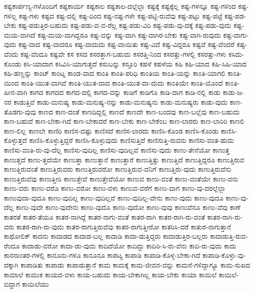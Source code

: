 {ಕಷ್ಟಕಾರ್ಪಣ್ಯ-ಗಳೊಂದಿಗೆ
ಕಷ್ಟಕಾರ್ಯ
ಕಷ್ಟಕಾಲ
ಕಷ್ಟಕಾಲ-ದಲ್ಲೆಲ್ಲಾ
ಕಷ್ಟಕ್ಕೆ
ಕಷ್ಟಕ್ಕೆಲ್ಲ
ಕಷ್ಟ-ಗಳನ್ನೂ
ಕಷ್ಟ-ಗಳಿಂದ
ಕಷ್ಟ-ಗಳಿಲ್ಲ
ಕಷ್ಟ-ಗಳು
ಕಷ್ಟದ
ಕಷ್ಟ-ದಲ್ಲಿ
ಕಷ್ಟ-ದಿಂದ
ಕಷ್ಟ-ನಷ್ಟ-ಗಳೇ
ಕಷ್ಟ-ಪಟ್ಟಿ-ರುವೆವು
ಕಷ್ಟ-ಪಟ್ಟು
ಕಷ್ಟ-ಪಟ್ಟೆ
ಕಷ್ಟ-ಪಡ-ಬೇಕು
ಕಷ್ಟ-ಪಡುತ್ತಿರ-ಬಹುದು
ಕಷ್ಟ-ಪಡು-ವ-ವ-ರೆಲ್ಲ
ಕಷ್ಟ-ಪಡು-ವಿರಿ
ಕಷ್ಟ-ಪಡು-ವು-ದಕ್ಕೆ
ಕಷ್ಟ-ಪಡು-ವುದು
ಕಷ್ಟ-ಮಯ-ವಾಗಿದೆ
ಕಷ್ಟ-ಮಯ-ವಾಗಿದ್ದರೂ
ಕಷ್ಟ-ವನ್ನು
ಕಷ್ಟ-ವಾಗಿ
ಕಷ್ಟ-ವಾಗಿರ-ಬೇಕು
ಕಷ್ಟ-ವಾಗಿ-ರುವುದು
ಕಷ್ಟ-ವಾಗು-ವುದು
ಕಷ್ಟ-ವಾದ
ಕಷ್ಟ-ವಾದರೂ
ಕಷ್ಟ-ವಾದುದು
ಕಷ್ಟ-ವಾಯಿತು
ಕಷ್ಟ-ವಿದೆ
ಕಷ್ಟ-ವಿದ್ದರೂ
ಕಷ್ಟವೆ
ಕಷ್ಟ-ವೆಂದರೆ
ಕಷ್ಟ-ವೆಂದು
ಕಷ್ಟ-ವೆಂದೂ
ಕಷ್ಟವೇ
ಕಸ
ಕಸದ
ಕಸರತ್ತಾಗ-ಬಹುದು
ಕಸರತ್ತಿ-ನಿಂದ
ಕಸರತ್ತು-ಗಳಲ್ಲಿ
ಕಸರತ್ತು-ಗಳು
ಕಸಿದು-ಕೊಂಡು
ಕಸಿ-ಯಾದಾಗ
ಕಸಿವಿಸಿ-ಯಾಗುತ್ತದೆ
ಕಸುಬನ್ನು
ಕಸ್ತೂರಿ
ಕಹಳೆ
ಕಹಳೆಯ
ಕಹಿ
ಕಹಿ-ಯಾದ
ಕಹಿ-ಸಿಹಿ-ಯಾದ
ಕಹಿ-ಹಣ್ಣನ್ನು
ಕಾಂಟ್
ಕಾಂಟ್ನ
ಕಾಂಡ-ವಾದ
ಕಾಂತಿ
ಕಾಂತಿ-ಪರಿಧಿ
ಕಾಂತಿಯ
ಕಾಂತಿ-ಯನ್ನು
ಕಾಂತಿ-ಯಾಗಲಿ
ಕಾಂತಿ-ಯಿಂದ
ಕಾಂತಿ-ಯುತ-ವಾಗಿವೆ
ಕಾಂತಿ-ಯುತ-ವಾದ
ಕಾಂತಿ-ಯುತ-ವಾ-ದುದು
ಕಾಂತಿಯೇ
ಕಾಂತಿ-ಯೊಂದೆ
ಕಾಂತಿ-ಹೀನ-ವಾಗಿ
ಕಾಗದ
ಕಾಗದದ
ಕಾಗದ-ದಲ್ಲಿ
ಕಾಗದ-ವನ್ನು
ಕಾಡಿಗೆ
ಕಾಡಿಗೊ
ಕಾಡಿ-ದಾಗ
ಕಾಡಿ-ನಲ್ಲಿ
ಕಾಡು
ಕಾಡು-ಜ-ನರ
ಕಾಡುತ್ತಿವೆ
ಕಾಡು-ಮನುಷ್ಯ
ಕಾಡು-ಮನುಷ್ಯ-ನನ್ನು
ಕಾಡು-ಮನುಷ್ಯನು
ಕಾಡು-ಮನುಷ್ಯರು
ಕಾಡು-ವುದು
ಕಾಣ-ತೊಡಗು-ವುವು
ಕಾಣದ
ಕಾಣ-ದಂತೆ
ಕಾಣದಿದ್ದಲ್ಲಿ
ಕಾಣದೆ
ಕಾಣದೇ
ಕಾಣ-ಬಂದವು
ಕಾಣ-ಬಲ್ಲೆವು
ಕಾಣ-ಬಹುದು
ಕಾಣ-ಬಹುದೆ
ಕಾಣ-ಬೇಕಾ-ಗಿದೆ
ಕಾಣ-ಬೇಕಾದರೆ
ಕಾಣ-ಬೇಕು
ಕಾಣ-ಬೇಕೆಂಬ
ಕಾಣ-ಲಾರರು
ಕಾಣ-ಲಾರಿರಿ
ಕಾಣಲಿ
ಕಾಣ-ಲಿಲ್ಲ
ಕಾಣಲೇ
ಕಾಣಿರಿ
ಕಾಣಿಸ-ದಷ್ಟು
ಕಾಣಿಸದೆ
ಕಾಣಿಸ-ಲಾರದು
ಕಾಣಿಸಿ-ಕೊಂಡ
ಕಾಣಿಸಿ-ಕೊಂಡು
ಕಾಣಿಸಿ-ಕೊಳ್ಳುತ್ತದೆ
ಕಾಣಿಸಿ-ಕೊಳ್ಳುತ್ತಿದ್ದರೆ
ಕಾಣಿಸಿ-ಕೊಳ್ಳುವುದು
ಕಾಣಿಸುತ್ತಿದೆ
ಕಾಣಿಸುತ್ತಿ-ರುವನು
ಕಾಣಿಸು-ವಂತ-ಹುದು
ಕಾಣಿಸು-ವಂತಿ-ರು-ವು-ದೆಲ್ಲ
ಕಾಣಿಸು-ವುದಿಲ್ಲ
ಕಾಣಿಸು-ವುದಿಲ್ಲವೆ
ಕಾಣಿಸು-ವುದು
ಕಾಣು-ತೇನೆಯೋ
ಕಾಣುತ್ತ
ಕಾಣುತ್ತದೆ
ಕಾಣು-ತ್ತದೆಯೇ
ಕಾಣುತ್ತಾ
ಕಾಣುತ್ತಾನೆ
ಕಾಣುತ್ತಾರೆ
ಕಾಣುತ್ತಿತ್ತು
ಕಾಣುತ್ತಿದೆ
ಕಾಣುತ್ತಿದ್ದರೂ
ಕಾಣುತ್ತಿರುವ
ಕಾಣುತ್ತಿರುವಂತೆ
ಕಾಣುತ್ತಿರುವರು
ಕಾಣುತ್ತಿರುವರೋ
ಕಾಣುತ್ತಿರುವ-ವನಿಗೆ
ಕಾಣುತ್ತಿರು-ವುದು
ಕಾಣುತ್ತಿರುವೆನು
ಕಾಣುತ್ತಿರುವೆವು
ಕಾಣುತ್ತೀರಿ
ಕಾಣುತ್ತೇವೆ
ಕಾಣುತ್ತೇವೆಯೋ
ಕಾಣುವ
ಕಾಣು-ವಂತೆ
ಕಾಣು-ವಂತೆಯೇ
ಕಾಣು-ವನು
ಕಾಣು-ವರು
ಕಾಣು-ವರೊ
ಕಾಣು-ವರೋ
ಕಾಣು-ವಳು
ಕಾಣುವ-ವರೆಗೆ
ಕಾಣು-ವಾಗ
ಕಾಣು-ವು-ದರಲ್ಲೆಲ್ಲಾ
ಕಾಣುವುದಾ-ವುದೂ
ಕಾಣು-ವುದಿಲ್ಲ
ಕಾಣು-ವುದಿಲ್ಲವೆ
ಕಾಣು-ವುದಿಲ್ಲ-ವೇನು
ಕಾಣು-ವುದು
ಕಾಣು-ವುದೂ
ಕಾಣು-ವು-ದೆಲ್ಲ
ಕಾಣು-ವುದೇ
ಕಾಣು-ವುದೇನು
ಕಾಣು-ವುದೊ
ಕಾಣು-ವುದೋ
ಕಾಣು-ವುವು
ಕಾಣುವೆನೂ
ಕಾಣು-ವೆವು
ಕಾಣೆ
ಕಾತರತೆ
ಕಾತರ-ತೆಯೂ
ಕಾತರ-ನಾಗಿದ್ದೆ
ಕಾತರ-ನಾಗು-ವಂತೆ
ಕಾತರ-ರಾಗಿ
ಕಾತರ-ರಾಗಿ-ರು-ವಂತೆ
ಕಾತರ-ರಾಗಿ-ರು-ವರು
ಕಾತರ-ರಾಗಿ-ರು-ವುದು
ಕಾತರ-ರಾಗುತ್ತಿರುವೆವು
ಕಾತರ-ರಾಗುತ್ತೀರೋ
ಕಾತರಿಸಿ-ದರೆ
ಕಾತುರ-ನಾಗುತ್ತಾನೆ
ಕಾಥೋಲಿಕ್
ಕಾದನು
ಕಾದಾಡದ
ಕಾದಾಡ-ಬಲ್ಲ
ಕಾದಾಡಿ
ಕಾದಾ-ಡುತ್ತಿದ್ದರು
ಕಾದಾಡುತ್ತಿರ-ಬಲ್ಲರು
ಕಾದಾಡುತ್ತಿ-ರುವ-ರೆಂದೂ
ಕಾದಾಡು-ವರೋ
ಕಾದಾ-ಡು-ವುದು
ಕಾದಿದೆಯೋ
ಕಾದಿದ್ದು
ಕಾದಿರಿ-ಸಿ-ರು-ವೆನು
ಕಾದಿ-ರು-ವುದು
ಕಾದು
ಕಾನನಾಂತರ-ಗಳಲ್ಲಿ
ಕಾನೂನು-ಗಳೂ
ಕಾನೂನೂ
ಕಾಪಟ್ಯ
ಕಾಪಾಡಿ
ಕಾಪಾಡಿ-ಕೊಳ್ಳ-ಬೇಕಾ-ಗಿದೆ
ಕಾಪಾಡಿ-ಕೊಳ್ಳು-ವು-ದಕ್ಕಾಗಿ
ಕಾಪಾಡಿತು
ಕಾಪಾಡು
ಕಾಪಾಡುತ್ತಾನೆ
ಕಾಮ
ಕಾಮಕ್ಕೆ
ಕಾಮ-ಜೀವನ-ವನ್ನು
ಕಾಮನೆ-ಗಳಿದ್ದಾಗ್ಯೂ
ಕಾಮ-ಸುಖದ
ಕಾಮಾಲೆ
ಕಾಮುಕ
ಕಾಯದ-ವಳು
ಕಾಯ-ಬಹುದು
ಕಾಯ-ಬೇಕಾಗಿಲ್ಲ
ಕಾಯ-ಬೇಕು
ಕಾಯಾ
ಕಾಯಿಲೆ
ಕಾಯಿಲೆ-ಬಿದ್ದಾಗ
ಕಾಯಿಲೆಯು
}
